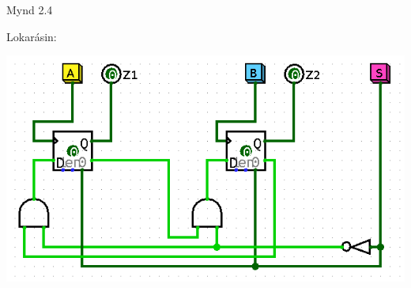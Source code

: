 \documentclass{article}
\begin{document}
Mynd 2.4

Lokarásin:
\begin{center}
    \includegraphics[scale=0.5]{imgs/Screenshot from 2022-03-25 14-00-12.png}
\end{center}
\end{document}
